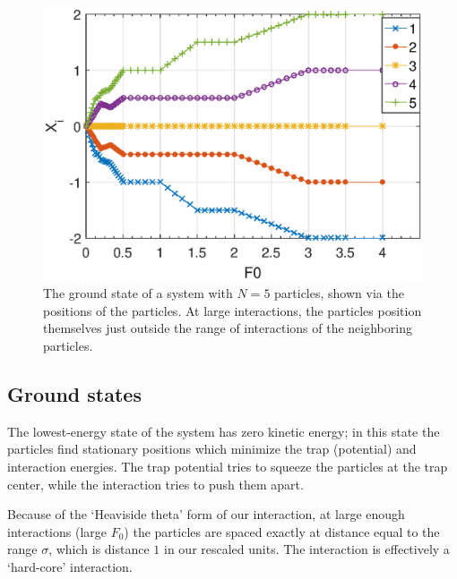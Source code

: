\documentclass[aps,preprintnumbers,onecolumn,amsmath,amssymb,floatfix,pra]{revtex4-1}
\begin{document}
\begin{figure}[tbhp]
\centering
\includegraphics[scale=0.6]{ZhiyuPictures/N=5_GS_pre_2_rev.eps}
\caption{The ground state of a system with $N=5$ particles, shown via the positions of the
  particles.  At large interactions, the particles position themselves just outside the range of
  interactions of the neighboring particles.}
\label{fig:GS1}
\end{figure}





\subsection{Ground states}

The lowest-energy state of the system has zero kinetic energy; in this state the particles find
stationary positions which minimize the trap (potential) and interaction energies.  The trap
potential tries to squeeze the particles at the trap center, while the interaction tries to push
them apart.

Because of the `Heaviside theta' form of our interaction, at large enough interactions (large $F_0$)
the particles are spaced exactly at distance equal to the range $\sigma$, which is distance $1$ in
our rescaled units.  The interaction is effectively a `hard-core' interaction.
\end{document}
